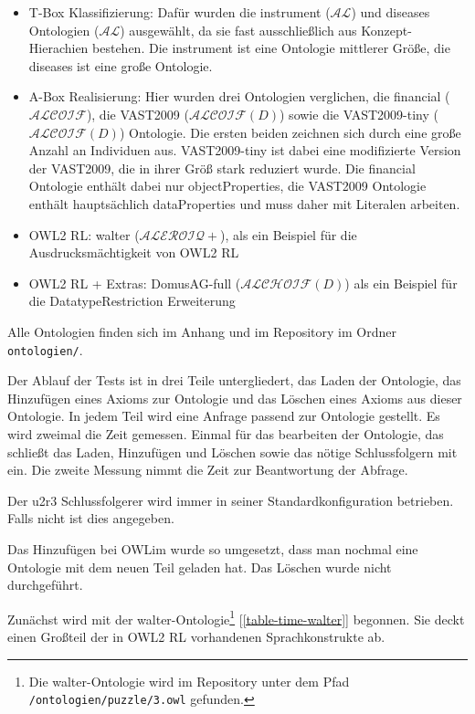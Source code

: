 \begin{itemize}
  \item T-Box Klassifizierung: Dafür wurden die instrument ($\mathcal{AL}$) und diseases Ontologien ($\mathcal{AL}$) ausgewählt, da sie fast ausschließlich aus Konzept-Hierachien bestehen. Die instrument ist eine Ontologie mittlerer Größe, die diseases ist eine große Ontologie.
  \item A-Box Realisierung: Hier wurden drei Ontologien verglichen, die financial ($\mathcal{ALCOIF}$), die VAST2009 ($\mathcal{ALCOIF}(D)$) sowie die VAST2009-tiny ($\mathcal{ALCOIF}(D)$) Ontologie. Die ersten beiden zeichnen sich durch eine große Anzahl an Individuen aus. VAST2009-tiny ist dabei eine modifizierte Version der VAST2009, die in ihrer Größ stark reduziert wurde. Die financial Ontologie enthält dabei nur objectProperties, die VAST2009 Ontologie enthält hauptsächlich dataProperties und muss daher mit Literalen arbeiten.
  \item OWL2 RL: walter ($\mathcal{ALEROIQ}+$), als ein Beispiel für die Ausdrucksmächtigkeit von OWL2 RL
  \item OWL2 RL + Extras: DomusAG-full ($\mathcal{ALCHOIF}(D)$) als ein Beispiel für die DatatypeRestriction Erweiterung
\end{itemize}

Alle Ontologien finden sich im Anhang und im Repository im Ordner \texttt{ontologien/}.

Der Ablauf der Tests ist in drei Teile untergliedert, das Laden der Ontologie, das Hinzufügen eines Axioms zur Ontologie und das Löschen eines Axioms aus dieser Ontologie. In jedem Teil wird eine Anfrage passend zur Ontologie gestellt. Es wird zweimal die Zeit gemessen. Einmal für das bearbeiten der Ontologie, das schließt das Laden, Hinzufügen und Löschen sowie das nötige Schlussfolgern mit ein. Die zweite Messung nimmt die Zeit zur Beantwortung der Abfrage.

Der u2r3 Schlussfolgerer wird immer in seiner Standardkonfiguration betrieben. Falls nicht ist dies angegeben.

Das Hinzufügen bei OWLim wurde so umgesetzt, dass man nochmal eine Ontologie mit dem neuen Teil geladen hat. Das Löschen wurde nicht durchgeführt.

Zunächst wird mit der walter-Ontologie\footnote{Die walter-Ontologie wird im Repository unter dem Pfad \texttt{/ontologien/puzzle/3.owl} gefunden.} [\ref{table-time-walter}] begonnen. Sie deckt einen Großteil der in OWL2 RL vorhandenen Sprachkonstrukte ab.

